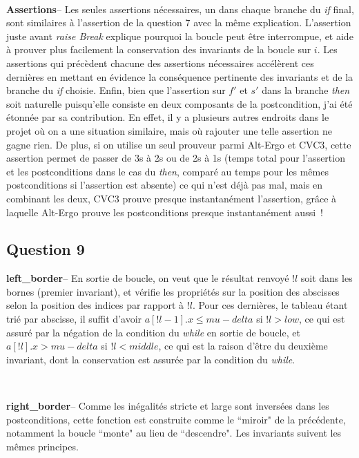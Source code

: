 \documentclass[11pt, openany, titlepage]{article}
\newcommand{\paragraphtitle}[1]{\textbf{#1}\;\;--\;}
\begin{document}
\

\paragraphtitle{Assertions}
Les seules assertions nécessaires, un dans chaque branche du \emph{if} final, sont similaires à l'assertion de la question 7 avec la même explication. L'assertion juste avant \emph{raise Break} explique pourquoi la boucle peut être interrompue, et aide à prouver plus facilement la conservation des invariants de la boucle sur $i$. Les assertions qui précèdent chacune des assertions nécessaires accélèrent ces dernières en mettant en évidence la conséquence pertinente des invariants et de la branche du \emph{if} choisie. Enfin, bien que l'assertion sur $f'$ et $s'$ dans la branche \emph{then} soit naturelle puisqu'elle consiste en deux composants de la postcondition, j'ai été étonnée par sa contribution. En effet, il y a plusieurs autres endroits dans le projet où on a une situation similaire, mais où rajouter une telle assertion ne gagne rien. De plus, si on utilise un seul prouveur parmi Alt-Ergo et CVC3, cette assertion permet de passer de 3s à 2s ou de 2s à 1s (temps total pour l'assertion et les postconditions dans le cas du \emph{then}, comparé au temps pour les mêmes postconditions si l'assertion est absente) ce qui n'est déjà pas mal, mais en combinant les deux, CVC3 prouve presque instantanément l'assertion, grâce à laquelle Alt-Ergo prouve les postconditions presque instantanément aussi~!


\subsection{Question 9}

\paragraphtitle{left\_border}
En sortie de boucle, on veut que le résultat renvoyé $!l$ soit dans les bornes (premier invariant), et vérifie les propriétés sur la position des abscisses selon la position des indices par rapport à $!l$. Pour ces dernières, le tableau étant trié par abscisse, il suffit d'avoir $a[!l-1].x \leq mu-delta$ si $!l > low$, ce qui est assuré par la négation de la condition du \emph{while} en sortie de boucle, et $a[!l].x > mu-delta$ si $!l < middle$, ce qui est la raison d'être du deuxième invariant, dont la conservation est assurée par la condition du \emph{while}.

\

\paragraphtitle{right\_border}
Comme les inégalités stricte et large sont inversées dans les postconditions, cette fonction est construite comme le ``miroir" de la précédente, notamment la boucle ``monte" au lieu de ``descendre". Les invariants suivent les mêmes principes.
\end{document}
